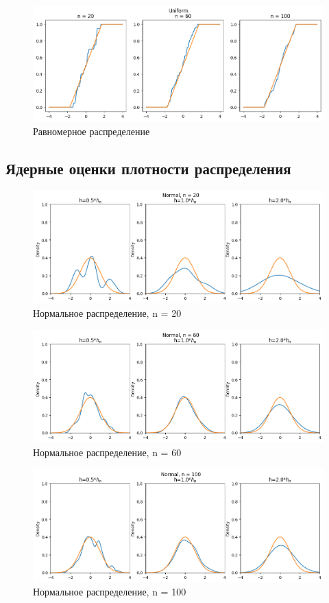 \begin{figure}[H]
	\includegraphics[width=\textwidth]{tasks/4/res/5.png}
	\caption{Равномерное распределение} 
\end{figure}
	
\subsection{Ядерные оценки плотности распределения}
\begin{figure}[H]
	\includegraphics[width=\textwidth]{tasks/4/res/11.png}
	\caption{Нормальное распределение, n = 20} 
\end{figure}
	
\begin{figure}[H]
	\includegraphics[width=\textwidth]{tasks/4/res/12.png}
	\caption{Нормальное распределение, n = 60} 
\end{figure}
	
\begin{figure}[H]
	\includegraphics[width=\textwidth]{tasks/4/res/13.png}
	\caption{Нормальное распределение, n = 100} 
\end{figure}
	
